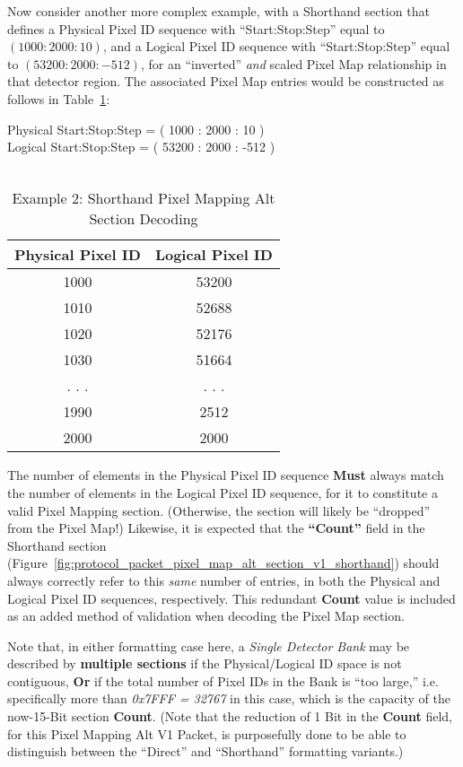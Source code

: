 Now consider another more complex example,
with a Shorthand section that defines a Physical Pixel ID sequence
with ``Start:Stop:Step'' equal to $ ( 1000 : 2000 : 10 ) $,
and a Logical Pixel ID sequence
with ``Start:Stop:Step'' equal to $ ( 53200 : 2000 : -512 ) $,
for an ``inverted'' {\it and} scaled Pixel Map relationship
in that detector region.
The associated Pixel Map entries would be constructed as follows
in Table~\ref{table:ex2_shorthand_pixel_map_alt_section_decode}:

\begin{table}[h]
  \begin{center}
	Physical Start:Stop:Step = ( 1000 : 2000 : 10 ) \\
	Logical Start:Stop:Step = ( 53200 : 2000 : -512 ) \\
	~ \\
    \begin{tabular}{c | c}
	Physical Pixel ID & Logical Pixel ID \\
	\hline
	1000 & 53200 \\
	1010 & 52688 \\
	1020 & 52176 \\
	1030 & 51664 \\
	. . . & . . . \\
	1990 & 2512 \\
	2000 & 2000 \\
    \end{tabular}
  \end{center}
  \caption {Example 2: Shorthand Pixel Mapping Alt Section Decoding}
  \label{table:ex2_shorthand_pixel_map_alt_section_decode}
\end{table}

The number of elements in the Physical Pixel ID sequence
{\bf Must} always match the number of elements
in the Logical Pixel ID sequence,
for it to constitute a valid Pixel Mapping section.
(Otherwise, the section will likely be ``dropped'' from the Pixel Map!)
Likewise, it is expected that the {\bf ``Count''} field
in the Shorthand section
(Figure~\ref{fig:protocol_packet_pixel_map_alt_section_v1_shorthand})
should always correctly refer to this {\it same} number of entries,
in both the Physical and Logical Pixel ID sequences, respectively.
This redundant {\bf Count} value is included as an added method
of validation when decoding the Pixel Map section.

Note that, in either formatting case here,
a {\it Single Detector Bank} may be described
by {\bf multiple sections}
if the Physical/Logical ID space is not contiguous,
{\bf Or} if the total number of Pixel IDs in the Bank is ``too large,''
i.e. specifically more than {\it 0x7FFF = 32767} in this case,
which is the capacity of the now-15-Bit section {\bf Count}.
(Note that the reduction of 1 Bit in the {\bf Count} field,
for this Pixel Mapping Alt V1 Packet,
is purposefully done to be able to distinguish between the ``Direct''
and ``Shorthand'' formatting variants.)


